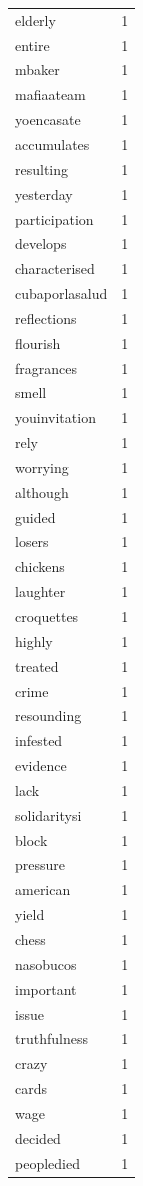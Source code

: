\begin{tabular}{lr}
elderly & 1 \\
entire & 1 \\
mbaker & 1 \\
mafiaateam & 1 \\
yoencasate & 1 \\
accumulates & 1 \\
resulting & 1 \\
yesterday & 1 \\
participation & 1 \\
develops & 1 \\
characterised & 1 \\
cubaporlasalud & 1 \\
reflections & 1 \\
flourish & 1 \\
fragrances & 1 \\
smell & 1 \\
youinvitation & 1 \\
rely & 1 \\
worrying & 1 \\
although & 1 \\
guided & 1 \\
losers & 1 \\
chickens & 1 \\
laughter & 1 \\
croquettes & 1 \\
highly & 1 \\
treated & 1 \\
crime & 1 \\
resounding & 1 \\
infested & 1 \\
evidence & 1 \\
lack & 1 \\
solidaritysi & 1 \\
block & 1 \\
pressure & 1 \\
american & 1 \\
yield & 1 \\
chess & 1 \\
nasobucos & 1 \\
important & 1 \\
issue & 1 \\
truthfulness & 1 \\
crazy & 1 \\
cards & 1 \\
wage & 1 \\
decided & 1 \\
peopledied & 1 \\

\end{tabular}

